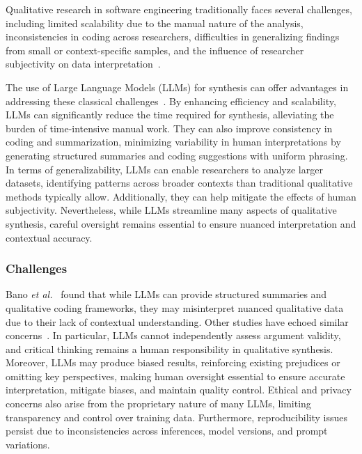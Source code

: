 Qualitative research in software engineering traditionally faces several challenges, including limited scalability due to the manual nature of the analysis, inconsistencies in coding across researchers, difficulties in generalizing findings from small or context-specific samples, and the influence of researcher subjectivity on data interpretation~\cite{DBLP:journals/ase/BanoHZT24}. 

The use of Large Language Models (LLMs) for synthesis can offer advantages in addressing these classical challenges~\cite{DBLP:journals/ase/BanoHZT24, barros2024largelanguagemodelqualitative, leça2024applicationsimplicationslargelanguage}. By enhancing efficiency and scalability, LLMs can significantly reduce the time required for synthesis, alleviating the burden of time-intensive manual work. They can also improve consistency in coding and summarization, minimizing variability in human interpretations by generating structured summaries and coding suggestions with uniform phrasing. In terms of generalizability, LLMs can enable researchers to analyze larger datasets, identifying patterns across broader contexts than traditional qualitative methods typically allow. Additionally, they can help mitigate the effects of human subjectivity. Nevertheless, while LLMs streamline many aspects of qualitative synthesis, careful oversight remains essential to ensure nuanced interpretation and contextual accuracy.

\subsubsection{Challenges}

Bano \textit{et al.}~\cite{bano2023exploringqualitativeresearchusing} found that while LLMs can provide structured summaries and qualitative coding frameworks, they may misinterpret nuanced qualitative data due to their lack of contextual understanding. Other studies have echoed similar concerns~\cite{DBLP:journals/ase/BanoHZT24, barros2024largelanguagemodelqualitative, leça2024applicationsimplicationslargelanguage}. In particular, LLMs cannot independently assess argument validity, and critical thinking remains a human responsibility in qualitative synthesis. Moreover, LLMs may produce biased results, reinforcing existing prejudices or omitting key perspectives, making human oversight essential to ensure accurate interpretation, mitigate biases, and maintain quality control. Ethical and privacy concerns also arise from the proprietary nature of many LLMs, limiting transparency and control over training data. Furthermore, reproducibility issues persist due to inconsistencies across inferences, model versions, and prompt variations.

